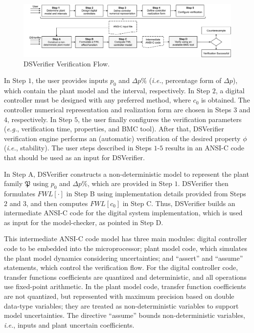 \documentclass{sig-alternate-05-2015}
\begin{document}
\begin{figure}[t]
\centering
\includegraphics[width=\textwidth]{figures/verification-flow.pdf}
\caption{DSVerifier Verification Flow.}
\label{DSVerifier_process}
\end{figure}

In Step $1$, the user provides inputs $p_0$ and $\Delta{p}\%$ ({\it i.e.}, percentage form of $\Delta{p}$), which contain the plant model and the interval, respectively. In Step $2$, a digital controller must be designed with any preferred method, where $c_0$ is obtained. The controller numerical representation and realization form are chosen in Steps $3$ and $4$, respectively. In Step $5$, the user finally configures the verification parameters ({\it e.g.}, verification time, properties, and BMC tool). After that, DSVerifier verification engine performs an (automatic) verification of the desired property $\phi$ ({\it i.e.}, stability). The user steps described in Steps $1$-$5$ results in an ANSI-C code that should be used as an input for DSVerifier.

In Step A, DSVerifier constructs a non-deterministic model to represent the plant family $\mathfrak{P}$ using $p_0$ and $\Delta{p}\%$, which are provided in Step $1$. DSVerifier then formulates $FWL[\cdot]$ in Step B using implementation details provided from Steps $2$ and $3$, and then computes $FWL[c_0]$ in Step C. Thus, DSVerifier builds an intermediate ANSI-C code for the digital system implementation, which is used as input for the model-checker, as pointed in Step D.

This intermediate ANSI-C code model has three main modules: digital controller code to be embedded into the microprocessor; plant model code, which simulates the plant model dynamics considering uncertainties; and ``assert'' and ``assume'' statements, which control the verification flow. For the digital controller code, transfer functions coefficients are quantized and deterministic, and all operations use fixed-point arithmetic. In the plant model code, transfer function coefficients are not quantized, but represented with maximum precision based on double data-type variables; they are treated as non-deterministic variables to support model uncertainties. The directive ``assume'' bounds non-deterministic variables, {\it i.e.}, inputs and plant uncertain coefficients.
\end{document}
